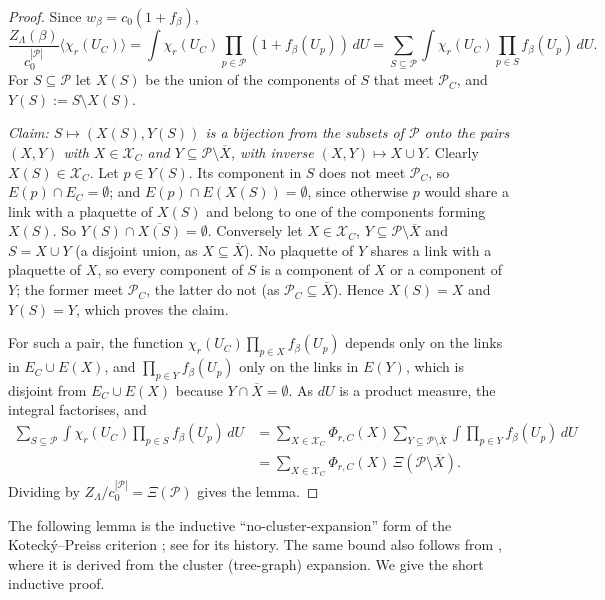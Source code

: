 \documentclass[11pt,a4paper]{article}
\theoremstyle{definition}
\theoremstyle{remark}
\newcommand{\cP}{\mathcal{P}}
\newcommand{\dU}{\,dU}
\newcommand{\cX}{\mathcal{X}}
\begin{document}
\begin{proof}
Since $w_\beta=c_0(1+f_\beta)$,
\[
\frac{Z_\Lambda(\beta)}{c_0^{|\cP|}}\langle\chi_r(U_C)\rangle=\int\chi_r(U_C)\prod_{p\in\cP}(1+f_\beta(U_p))\dU
=\sum_{S\subseteq\cP}\int\chi_r(U_C)\prod_{p\in S}f_\beta(U_p)\dU .
\]
For $S\subseteq\cP$ let $X(S)$ be the union of the components of $S$ that meet $\cP_C$, and $Y(S):=S\setminus X(S)$.

\emph{Claim: $S\mapsto(X(S),Y(S))$ is a bijection from the subsets of $\cP$ onto the pairs $(X,Y)$ with $X\in\cX_C$ and
$Y\subseteq\cP\setminus\overline X$, with inverse $(X,Y)\mapsto X\cup Y$.} Clearly $X(S)\in\cX_C$. Let $p\in Y(S)$. Its
component in $S$ does not meet $\cP_C$, so $E(p)\cap E_C=\emptyset$; and $E(p)\cap E(X(S))=\emptyset$, since otherwise $p$
would share a link with a plaquette of $X(S)$ and belong to one of the components forming $X(S)$. So
$Y(S)\cap\overline{X(S)}=\emptyset$. Conversely let $X\in\cX_C$, $Y\subseteq\cP\setminus\overline X$ and $S=X\cup Y$
(a disjoint union, as $X\subseteq\overline X$). No plaquette of $Y$ shares a link with a plaquette of $X$, so every
component of $S$ is a component of $X$ or a component of $Y$; the former meet $\cP_C$, the latter do not (as
$\cP_C\subseteq\overline X$). Hence $X(S)=X$ and $Y(S)=Y$, which proves the claim.

For such a pair, the function $\chi_r(U_C)\prod_{p\in X}f_\beta(U_p)$ depends only on the links in
$E_C\cup E(X)$, and $\prod_{p\in Y}f_\beta(U_p)$ only on the links in $E(Y)$, which is disjoint from
$E_C\cup E(X)$ because $Y\cap\overline X=\emptyset$. As $dU$ is a product measure, the integral factorises, and
\begin{align*}
\sum_{S\subseteq\cP}\int\chi_r(U_C)\prod_{p\in S}f_\beta(U_p)\dU
&=\sum_{X\in\cX_C}\Phi_{r,C}(X)\sum_{Y\subseteq\cP\setminus\overline X}\int\prod_{p\in Y}f_\beta(U_p)\dU\\
&=\sum_{X\in\cX_C}\Phi_{r,C}(X)\,\Xi(\cP\setminus\overline X).
\end{align*}
Dividing by $Z_\Lambda/c_0^{|\cP|}=\Xi(\cP)$ gives the lemma.
\end{proof}

The following lemma is the inductive ``no-cluster-expansion'' form of the Kotecký--Preiss criterion
\cite{KP86,Dob96}; see \cite[Section~1]{FP07} for its history. The same bound also follows from
\cite[(2.11), (2.14), (2.15)]{FP07}, where it is derived from the cluster (tree-graph) expansion. We give the short inductive
proof.
\end{document}
